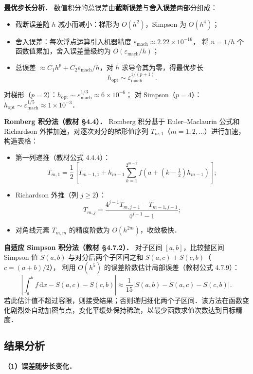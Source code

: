 \documentclass[UTF8,a4paper,11pt]{article}
\begin{document}
\noindent\textbf{最优步长分析．}
数值积分的总误差由\textbf{截断误差}与\textbf{舍入误差}两部分组成：
\begin{itemize}
  \item 截断误差随 $h$ 减小而减小：梯形为 $O(h^2)$，Simpson 为 $O(h^4)$；
  \item 舍入误差：每次浮点运算引入机器精度 $\varepsilon_{\mathrm{mach}}\approx 2.22\times10^{-16}$，
    将 $n=1/h$ 个函数值累加，舍入误差量级约为 $O(\varepsilon_{\mathrm{mach}}/h)$；
  \item 总误差 $\approx C_1 h^p + C_2\varepsilon_{\mathrm{mach}}/h$，对 $h$ 求导令其为零，得最优步长
    $$h_{\mathrm{opt}} \sim \varepsilon_{\mathrm{mach}}^{1/(p+1)}.$$
\end{itemize}
对梯形（$p=2$）：$h_{\mathrm{opt}}\sim\varepsilon_{\mathrm{mach}}^{1/3}\approx 6\times10^{-6}$；
对 Simpson（$p=4$）：$h_{\mathrm{opt}}\sim\varepsilon_{\mathrm{mach}}^{1/5}\approx 1\times10^{-3}$．

\noindent\textbf{Romberg 积分法（教材 §4.4）．}
Romberg 积分基于 Euler–Maclaurin 公式和 Richardson 外推加速，对逐次对分的梯形值序列
$T_{m,1}$（$m=1,2,\ldots$）进行加速，构造表格：
\begin{itemize}
  \item 第一列递推（教材公式 4.4.4）：
    $$T_{m,1} = \frac{1}{2}\left[T_{m-1,1} + h_{m-1}\sum_{k=1}^{2^{m-2}}f\!\left(a+\left(k-\tfrac{1}{2}\right)h_{m-1}\right)\right];$$
  \item Richardson 外推（列 $j\geq2$）：
    $$T_{m,j} = \frac{4^{j-1}T_{m,j-1}-T_{m-1,j-1}}{4^{j-1}-1};$$
  \item 对角线元素 $T_{m,m}$ 的精度阶数为 $O(h^{2m})$，收敛极快．
\end{itemize}

\noindent\textbf{自适应 Simpson 积分法（教材 §4.7.2）．}
对子区间 $[a,b]$，比较整区间 Simpson 值 $S(a,b)$ 与对分后两个子区间之和 $S(a,c)+S(c,b)$（$c=(a+b)/2$），
利用 $O(h^5)$ 的误差阶数估计局部误差（教材公式 4.7.9）：
$$\left|\int_a^b f\,\mathrm{d}x - S(a,c)-S(c,b)\right|\approx\frac{1}{15}|S(a,b)-S(a,c)-S(c,b)|.$$
若此估计值不超过容限，则接受结果；否则递归细化两个子区间．该方法在函数变化剧烈处自动加密节点，变化平缓处保持稀疏，以最少函数求值次数达到目标精度．

\subsection{结果分析}

\noindent\textbf{（1）误差随步长变化．}
\end{document}
